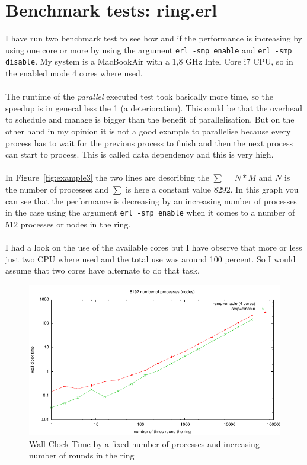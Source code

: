 
\section{Benchmark tests: ring.erl}
I have run two benchmark test to see how and if the performance is increasing by using one core or more by using the argument \texttt{erl -smp enable} and \texttt{erl -smp disable}. My system is a MacBookAir with a 1,8 GHz Intel Core i7 CPU, so in the enabled mode 4 cores where used. \\
\\
The runtime of the \textit{parallel} executed test took basically more time, so the speedup is in general less the 1 (a deterioration). This could be that the overhead to schedule and manage is bigger than the benefit of parallelisation. But on the other hand in my opinion it is not a good example to parallelise because every process has to wait for the previous process to finish and then the next process can start to process. This is called data dependency and this is very high. \\
\\
In Figure~\ref{fig:example3} the two lines are describing the $\sum = N * M$ and $N$ is the number of processes and $\sum$ is here a constant value $8292$. In this graph you can see that  the performance is decreasing by an increasing number of processes in the case using the argument \texttt{erl -smp enable} when it comes to a number of 512 processes or nodes in the ring. \\
\\
I had a look on the use of the available cores but I have observe that more or less just two CPU where used and the total use was around 100 percent. So I would assume that two cores have alternate to do that task.
\begin{figure}[h!]
	\center
	\includegraphics[width=1\textwidth]{img/8192_number_of_processes.pdf}
	\caption{Wall Clock Time by a fixed number of processes and increasing number of rounds in the ring}
    \label{fig:example1}
\end{figure}
